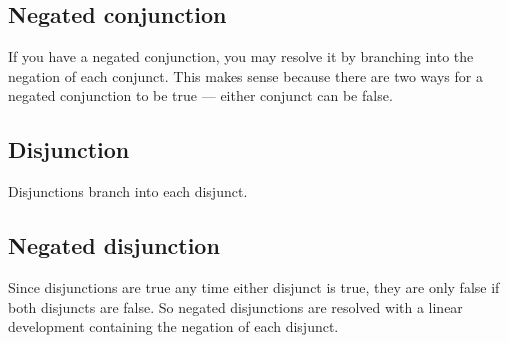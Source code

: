 
\subsection{Negated conjunction}

If you have a negated conjunction, you may resolve it by branching into the negation of each conjunct. This makes sense because there are two ways for a negated conjunction to be true --- either conjunct can be false.


\subsection{Disjunction}
\label{subsec.DisjunctionTreeRule}
\begin{groupitems}
Disjunctions branch into each disjunct.

\end{groupitems}

\subsection{Negated disjunction}

Since disjunctions are true any time either disjunct is true, they are only false if both disjuncts are false. So negated disjunctions are resolved with a linear development containing the negation of each disjunct.


